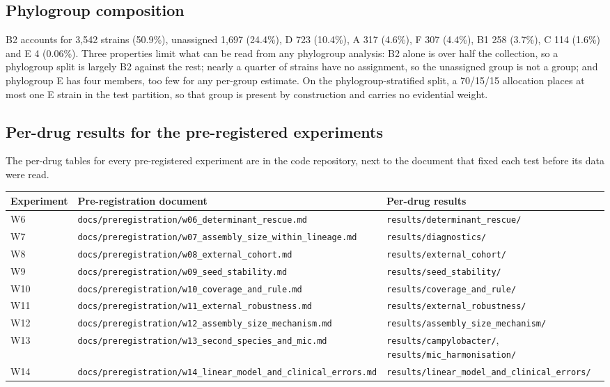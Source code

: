 \documentclass[11pt]{article}
\begin{document}
\subsection{Phylogroup composition}
B2 accounts for 3,542 strains (50.9\%), unassigned 1,697 (24.4\%), D 723 (10.4\%), A 317 (4.6\%),
F 307 (4.4\%), B1 258 (3.7\%), C 114 (1.6\%) and E 4 (0.06\%). Three properties limit what can be
read from any phylogroup analysis: B2 alone is over half the collection, so a phylogroup split is
largely B2 against the rest; nearly a quarter of strains have no assignment, so the unassigned group
is not a group; and phylogroup E has four members, too few for any per-group estimate. On the
phylogroup-stratified split, a 70/15/15 allocation places at most one E strain in the test
partition, so that group is present by construction and carries no evidential weight.

\subsection{Per-drug results for the pre-registered experiments}
The per-drug tables for every pre-registered experiment are in the code repository, next to the
document that fixed each test before its data were read.

\begin{table}[h]\centering\small
\begin{tabular}{lll}
\toprule
Experiment & Pre-registration document & Per-drug results \\
\midrule
W6 & \texttt{docs/preregistration/w06\_determinant\_rescue.md} & \texttt{results/determinant\_rescue/} \\
W7 & \texttt{docs/preregistration/w07\_assembly\_size\_within\_lineage.md} & \texttt{results/diagnostics/} \\
W8 & \texttt{docs/preregistration/w08\_external\_cohort.md} & \texttt{results/external\_cohort/} \\
W9 & \texttt{docs/preregistration/w09\_seed\_stability.md} & \texttt{results/seed\_stability/} \\
W10 & \texttt{docs/preregistration/w10\_coverage\_and\_rule.md} & \texttt{results/coverage\_and\_rule/} \\
W11 & \texttt{docs/preregistration/w11\_external\_robustness.md} & \texttt{results/external\_robustness/} \\
W12 & \texttt{docs/preregistration/w12\_assembly\_size\_mechanism.md} & \texttt{results/assembly\_size\_mechanism/} \\
W13 & \texttt{docs/preregistration/w13\_second\_species\_and\_mic.md} & \texttt{results/campylobacter/}, \texttt{results/mic\_harmonisation/} \\
W14 & \texttt{docs/preregistration/w14\_linear\_model\_and\_clinical\_errors.md} & \texttt{results/linear\_model\_and\_clinical\_errors/} \\
\bottomrule
\end{tabular}
\end{table}



\end{document}
